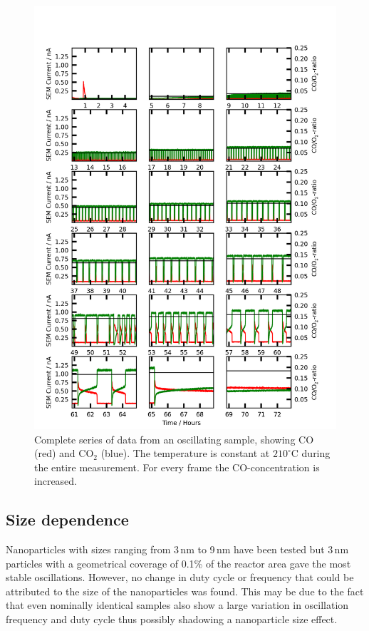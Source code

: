\documentclass[journal=jacsat,manuscript=article]{achemso}
\begin{document}
\begin{figure}
  \includegraphics[width=14cm]{oscil_gas_dependence.png}
  \caption{Complete series of data from an oscillating sample, showing CO (red) and CO$_2$
  (blue). The temperature is constant at $210^\circ$C during the entire
  measurement. For every frame the CO-concentration is increased.}
  \label{fgr:gas_dependence}
\end{figure}


\subsection{Size dependence}
Nanoparticles with sizes ranging from 3\,nm to 9\,nm have been tested but 3\,nm
particles with a geometrical coverage of 0.1\% of the reactor area gave the
most stable oscillations. 
However, no change in duty cycle or frequency that could be
attributed to the size of the nanoparticles was found. This may be due to the
fact that even nominally identical samples also show a large variation in
oscillation frequency and duty cycle thus possibly shadowing a nanoparticle
size effect.
\end{document}
